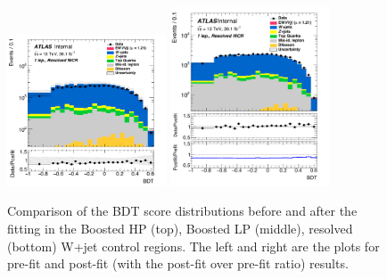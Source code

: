 \begin{figure}[!ht]
	\includegraphics[width=0.42\textwidth]{Chapter5/BDT_1lep_res_WCR_prefit.pdf}
    \includegraphics[width=0.42\textwidth]{Chapter5/BDT_1lep_res_WCR_postfit.pdf}	
	\caption{\label{Fig:data_mc_vbs_wcr}
		Comparison of the BDT score distributions before and after the fitting in the  
		Boosted HP (top), Boosted LP (middle), resolved (bottom) W+jet control regions. The left and right are the plots for pre-fit and post-fit (with the post-fit over pre-fit ratio) results. 
	}
\end{figure}
